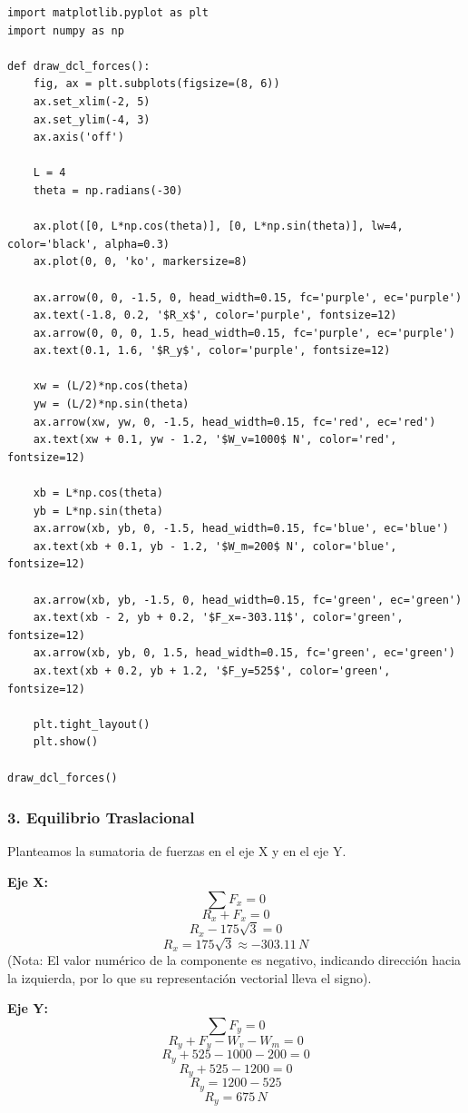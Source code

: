 \documentclass[12pt, a4paper]{article}
\begin{document}
\begin{lstlisting}
import matplotlib.pyplot as plt
import numpy as np

def draw_dcl_forces():
    fig, ax = plt.subplots(figsize=(8, 6))
    ax.set_xlim(-2, 5)
    ax.set_ylim(-4, 3)
    ax.axis('off')
    
    L = 4
    theta = np.radians(-30)
    
    ax.plot([0, L*np.cos(theta)], [0, L*np.sin(theta)], lw=4, color='black', alpha=0.3)
    ax.plot(0, 0, 'ko', markersize=8)
    
    ax.arrow(0, 0, -1.5, 0, head_width=0.15, fc='purple', ec='purple')
    ax.text(-1.8, 0.2, '$R_x$', color='purple', fontsize=12)
    ax.arrow(0, 0, 0, 1.5, head_width=0.15, fc='purple', ec='purple')
    ax.text(0.1, 1.6, '$R_y$', color='purple', fontsize=12)
    
    xw = (L/2)*np.cos(theta)
    yw = (L/2)*np.sin(theta)
    ax.arrow(xw, yw, 0, -1.5, head_width=0.15, fc='red', ec='red')
    ax.text(xw + 0.1, yw - 1.2, '$W_v=1000$ N', color='red', fontsize=12)
    
    xb = L*np.cos(theta)
    yb = L*np.sin(theta)
    ax.arrow(xb, yb, 0, -1.5, head_width=0.15, fc='blue', ec='blue')
    ax.text(xb + 0.1, yb - 1.2, '$W_m=200$ N', color='blue', fontsize=12)
    
    ax.arrow(xb, yb, -1.5, 0, head_width=0.15, fc='green', ec='green')
    ax.text(xb - 2, yb + 0.2, '$F_x=-303.11$', color='green', fontsize=12)
    ax.arrow(xb, yb, 0, 1.5, head_width=0.15, fc='green', ec='green')
    ax.text(xb + 0.2, yb + 1.2, '$F_y=525$', color='green', fontsize=12)

    plt.tight_layout()
    plt.show()

draw_dcl_forces()
\end{lstlisting}

\subsubsection*{3. Equilibrio Traslacional}
Planteamos la sumatoria de fuerzas en el eje X y en el eje Y.

\textbf{Eje X:}
$$\sum F_x = 0$$
$$R_x + F_x = 0$$
$$R_x - 175\sqrt{3} = 0$$
$$R_x = 175\sqrt{3} \approx -303.11 \, \si{N}$$
(Nota: El valor numérico de la componente es negativo, indicando dirección hacia la izquierda, por lo que su representación vectorial lleva el signo).

\textbf{Eje Y:}
$$\sum F_y = 0$$
$$R_y + F_y - W_v - W_m = 0$$
$$R_y + 525 - 1000 - 200 = 0$$
$$R_y + 525 - 1200 = 0$$
$$R_y = 1200 - 525$$
$$R_y = 675 \, \si{N}$$
\end{document}
